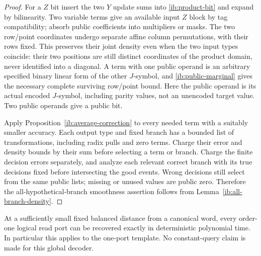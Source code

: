 \begin{proof}
For a \(Z\) bit insert the two \(Y\) update sums into
\eqref{ib:product-bit} and expand by bilinearity.  Two variable
terms give an available input \(Z\) block by tag compatibility;
absorb public coefficients into multipliers or masks.  The two
row/point coordinates undergo separate affine column permutations,
with their rows fixed.  This preserves their joint density even
when the two input types coincide: their two positions are still
distinct coordinates of the product domain, never identified into
a diagonal.  A term with one public operand is an arbitrary
specified binary linear form of the other \(J\)-symbol, and
\eqref{ib:public-marginal} gives the necessary complete surviving
row/point bound.  Here the public operand is its actual encoded
\(J\)-symbol, including parity values, not an unencoded target
value.  Two public operands give a public bit.

Apply Proposition~\ref{ib:average-correction} to every needed term
with a suitably smaller accuracy.  Each output type and fixed
branch has a bounded list of transformations, including radix
pulls and zero terms.  Charge their error and density bounds by
their sum before selecting a term or branch.  Charge the finite
decision errors separately, and analyze each relevant correct
branch with its true decisions fixed before intersecting the good
events.  Wrong decisions still select from the same public lists;
missing or unused values are public zero.  Therefore the
all-hypothetical-branch smoothness assertion follows from
Lemma~\ref{ib:all-branch-density}.
\end{proof}

\begin{proposition}
\label{ib:global-recovery}
At a sufficiently small fixed balanced distance from a canonical
word, every order-one logical read port can be recovered exactly
in deterministic polynomial time.  In particular this applies to
the one-port template.  No constant-query claim is made for this
global decoder.
\end{proposition}

